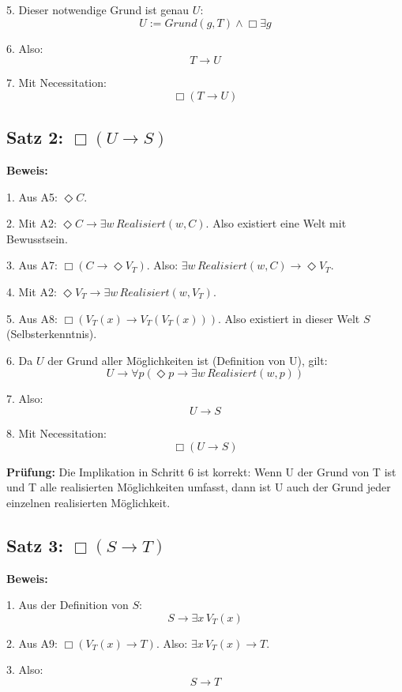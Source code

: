 \documentclass[
]{article}
\begin{document}
5. Dieser notwendige Grund ist genau \(U\):  
   \[
   U := Grund(g, T) \land \Box \exists g
   \]

6. Also:  
   \[
   T \rightarrow U
   \]

7. Mit Necessitation:  
   \[
   \boxed{\Box(T \rightarrow U)}
   \]

\subsection{Satz 2: \(\Box(U \rightarrow S)\)}\label{satz-2-boxu-rightarrow-s}

\textbf{Beweis:}

1. Aus A5: \(\Diamond C\).

2. Mit A2: \(\Diamond C \rightarrow \exists w\, Realisiert(w,C)\).  
   Also existiert eine Welt mit Bewusstsein.

3. Aus A7: \(\Box(C \rightarrow \Diamond V_T)\).  
   Also: \(\exists w\, Realisiert(w,C) \rightarrow \Diamond V_T\).

4. Mit A2: \(\Diamond V_T \rightarrow \exists w\, Realisiert(w,V_T)\).

5. Aus A8: \(\Box(V_T(x) \rightarrow V_T(V_T(x)))\).  
   Also existiert in dieser Welt \(S\) (Selbsterkenntnis).

6. Da \(U\) der Grund aller Möglichkeiten ist (Definition von U), gilt:  
   \[
   U \rightarrow \forall p(\Diamond p \rightarrow \exists w\, Realisiert(w,p))
   \]

7. Also:  
   \[
   U \rightarrow S
   \]

8. Mit Necessitation:  
   \[
   \boxed{\Box(U \rightarrow S)}
   \]

\textbf{Prüfung:} Die Implikation in Schritt 6 ist korrekt: Wenn U der Grund von T ist und T alle realisierten Möglichkeiten umfasst, dann ist U auch der Grund jeder einzelnen realisierten Möglichkeit.

\subsection{Satz 3: \(\Box(S \rightarrow T)\)}\label{satz-3-boxs-rightarrow-t}

\textbf{Beweis:}

1. Aus der Definition von \(S\):  
   \[
   S \rightarrow \exists x\, V_T(x)
   \]

2. Aus A9: \(\Box(V_T(x) \rightarrow T)\).  
   Also: \(\exists x\, V_T(x) \rightarrow T\).

3. Also:  
   \[
   S \rightarrow T
   \]
\end{document}

